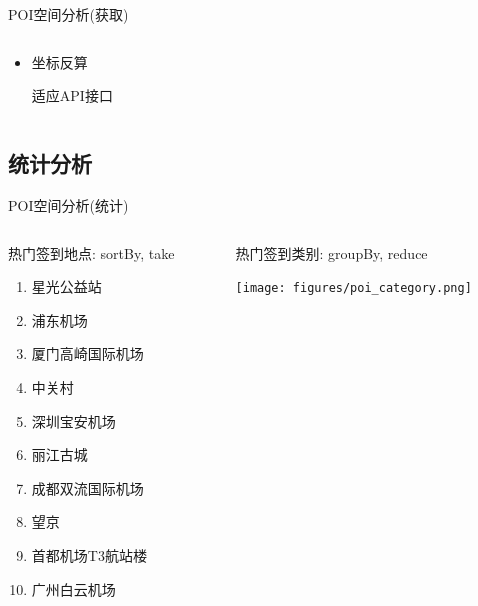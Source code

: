 \begin{frame}[c]{POI空间分析(获取)}
\begin{columns}
\begin{column}{0.5 \textwidth}
\begin{itemize}
                \pause
                \item \alert{坐标反算}

                适应API接口

            \end{itemize}
            
        \end{column}
    \end{columns}
\end{frame}

\subsection{统计分析}

\begin{frame}[c]{POI空间分析(统计)}
    \begin{columns}
        \vspace{0.5em}
        \begin{column}{0.5 \textwidth}
            \alert{热门签到地点}: sortBy, take

            \pause
            \begin{enumerate}
                \item 星光公益站
                \item 浦东机场
                \item 厦门高崎国际机场
                \item 中关村
                \item 深圳宝安机场
                \item 丽江古城
                \item 成都双流国际机场
                \item 望京
                \item 首都机场T3航站楼
                \item 广州白云机场
            \end{enumerate}
        \end{column}

        \pause
        \vspace{0.5em}
        \begin{column}{0.5 \textwidth}
            \alert{热门签到类别}: groupBy, reduce

            \pause
            \vspace{2em}
            \texttt{[image: figures/poi\_category.png]}
        \end{column}
    \end{columns}
\end{frame}



